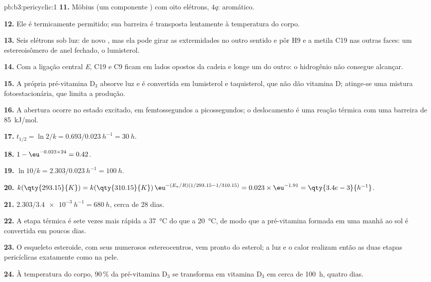 \begin{solution}{pb:b3:pericyclic:1}
\textbf{11.} Möbius (um componente ) com oito elétrons, $4q$: aromático.

\textbf{12.} Ele é termicamente permitido; sua barreira é transposta lentamente à temperatura do corpo.

\textbf{13.} Seis elétrons sob luz: de novo , mas ela pode girar as extremidades no
outro sentido e pôr H9 e a metila C19 nas outras faces: um estereoisômero de anel
fechado, o lumisterol.

\textbf{14.} Com a ligação central \textit{E}, C19 e C9 ficam em lados opostos da cadeia e longe
um do outro: o hidrogênio não consegue alcançar.

\textbf{15.} A própria pré-vitamina D$_3$ absorve luz e é convertida em lumisterol e taquisterol,
que não dão vitamina D; atinge-se uma mistura fotoestacionária, que limita a
produção.

\textbf{16.} A abertura ocorre no estado excitado, em femtossegundos a picossegundos;
o deslocamento é uma reação térmica com uma barreira de \qty{85}{kJ/mol}.

\textbf{17.} $t_{1/2} = \ln 2/k = 0.693/\qty{0.023}{h^{-1}} = \qty{30}{h}$.

\textbf{18.} $1 - \eu^{-0.023 \times 24} = 0.42$.

\textbf{19.} $\ln 10/k = 2.303/\qty{0.023}{h^{-1}} = \qty{100}{h}$.

\textbf{20.} $k(\qty{293.15}{K}) = k(\qty{310.15}{K})\,\eu^{-(E_a/R)(1/293.15 - 1/310.15)} = 0.023 \times \eu^{-1.91} = \qty{3.4e-3}{h^{-1}}$.

\textbf{21.} $2.303/\qty{3.4e-3}{h^{-1}} = \qty{680}{h}$, cerca de 28 dias.

\textbf{22.} A etapa térmica é sete vezes mais rápida a \qty{37}{\celsius} do que a \qty{20}{\celsius}, de modo que a
pré-vitamina formada em uma manhã ao sol é convertida em poucos dias.

\textbf{23.} O esqueleto esteroide, com seus numerosos estereocentros, vem pronto do
esterol; a luz e o calor realizam então as duas etapas pericíclicas exatamente como na
pele.

\textbf{24.} À temperatura do corpo, 90\,\% da pré-vitamina D$_3$ se transforma em vitamina D$_3$ em cerca de
\qty{100}{h}, quatro dias.
\end{solution}

